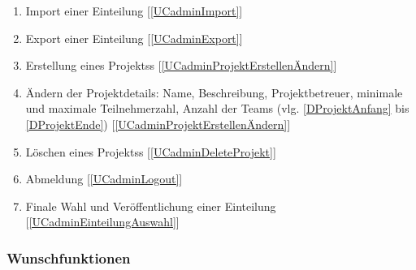 \documentclass[parskip=full]{scrartcl}
\newcommand{\swtLabel}[1]{\textbf{/#1\arabic*0/}}
\newcommand{\testRef}[1]{[\ref{#1}]}
\begin{document}
\begin{enumerate}[label=\swtLabel{FA}, resume]
  \item Import einer Einteilung \label{FAimport} \testRef{UCadminImport}
  \item Export einer Einteilung \label{FAexport}\testRef{UCadminExport}
  \item Erstellung eines \glspl{Projekt}s \label{FAadminCreateProjekt}
  \testRef{UCadminProjektErstellenÄndern}
  \item Ändern der Projektdetails: Name, Beschreibung, Projektbetreuer, %
        minimale und maximale Teilnehmerzahl, Anzahl der Teams (vlg.
        \ref{DProjektAnfang} bis \ref{DProjektEnde})
        \label{FAadminProjektänderung} \testRef{UCadminProjektErstellenÄndern}
  \item Löschen eines \glspl{Projekt}s \label{FAadminDeleteProjekt}
  \testRef{UCadminDeleteProjekt}
  \item Abmeldung \label{FAadminAbmeldung} \testRef{UCadminLogout}
  \item Finale Wahl und Veröffentlichung einer Einteilung \label{FAadminAuswahl}
  \testRef{UCadminEinteilungAuswahl}
\end{enumerate}

\subsubsection{Wunschfunktionen}
\end{document}

